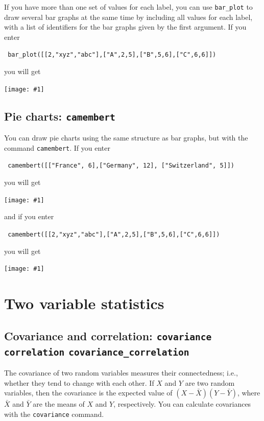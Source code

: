 \documentclass[a4paper,11pt]{book}
\newcommand{\includeimage}[1]
{\texttt{[image: \#1]}}
\begin{document}
If you have more than one set of values for each label, you can use
\texttt{bar\_plot} to draw several bar graphs at the same time by
including all values for each label, with a list of identifiers for
the bar graphs given by the first argument.  If you enter
\begin{center}
  \tt
  bar\_plot([[2,"xyz","abc"],["A",2,5],["B",5,6],["C",6,6]])
\end{center}
you will get
\begin{center}
  \includeimage{xcas-barplot2.png}
\end{center}

\subsection{Pie charts: \texttt{camembert}}

You can draw pie charts using the same structure as bar graphs, but
with the command \texttt{camembert}.  If you enter
\begin{center}
  \tt
  camembert([["France", 6],["Germany", 12], ["Switzerland", 5]])
\end{center}
you will get
\begin{center}
  \includeimage{xcas-piechart1.png}
\end{center}
and if you enter
\begin{center}
  \tt
  camembert([[2,"xyz","abc"],["A",2,5],["B",5,6],["C",6,6]])
\end{center}
you will get
\begin{center}
  \includeimage{xcas-piechart2.png}
\end{center}

\section{Two variable statistics}

\subsection{Covariance and correlation: \texttt{covariance} \texttt{correlation} \texttt{covariance\_correlation}}

The covariance of two random variables measures their connectedness;
i.e., whether they tend to change with each other.
If $X$ and $Y$ are two random variables, then the covariance is the
expected value of $(X-\bar{X})(Y-\bar{Y})$, where $\bar{X}$ and
$\bar{Y}$ are the means of $X$ and $Y$, respectively.  You can
calculate covariances with the \texttt{covariance} command.
\end{document}
